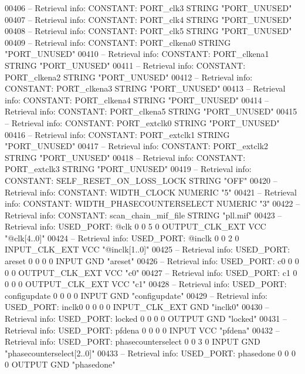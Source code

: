 \begin{DoxyCode}
{00406 \textcolor{keyword}{-- Retrieval info: CONSTANT: PORT\_clk3 STRING "PORT\_UNUSED"}
00407 \textcolor{keyword}{-- Retrieval info: CONSTANT: PORT\_clk4 STRING "PORT\_UNUSED"}
00408 \textcolor{keyword}{-- Retrieval info: CONSTANT: PORT\_clk5 STRING "PORT\_UNUSED"}
00409 \textcolor{keyword}{-- Retrieval info: CONSTANT: PORT\_clkena0 STRING "PORT\_UNUSED"}
00410 \textcolor{keyword}{-- Retrieval info: CONSTANT: PORT\_clkena1 STRING "PORT\_UNUSED"}
00411 \textcolor{keyword}{-- Retrieval info: CONSTANT: PORT\_clkena2 STRING "PORT\_UNUSED"}
00412 \textcolor{keyword}{-- Retrieval info: CONSTANT: PORT\_clkena3 STRING "PORT\_UNUSED"}
00413 \textcolor{keyword}{-- Retrieval info: CONSTANT: PORT\_clkena4 STRING "PORT\_UNUSED"}
00414 \textcolor{keyword}{-- Retrieval info: CONSTANT: PORT\_clkena5 STRING "PORT\_UNUSED"}
00415 \textcolor{keyword}{-- Retrieval info: CONSTANT: PORT\_extclk0 STRING "PORT\_UNUSED"}
00416 \textcolor{keyword}{-- Retrieval info: CONSTANT: PORT\_extclk1 STRING "PORT\_UNUSED"}
00417 \textcolor{keyword}{-- Retrieval info: CONSTANT: PORT\_extclk2 STRING "PORT\_UNUSED"}
00418 \textcolor{keyword}{-- Retrieval info: CONSTANT: PORT\_extclk3 STRING "PORT\_UNUSED"}
00419 \textcolor{keyword}{-- Retrieval info: CONSTANT: SELF\_RESET\_ON\_LOSS\_LOCK STRING "OFF"}
00420 \textcolor{keyword}{-- Retrieval info: CONSTANT: WIDTH\_CLOCK NUMERIC "5"}
00421 \textcolor{keyword}{-- Retrieval info: CONSTANT: WIDTH\_PHASECOUNTERSELECT NUMERIC "3"}
00422 \textcolor{keyword}{-- Retrieval info: CONSTANT: scan\_chain\_mif\_file STRING "pll.mif"}
00423 \textcolor{keyword}{-- Retrieval info: USED\_PORT: @clk 0 0 5 0 OUTPUT\_CLK\_EXT VCC "@clk[4..0]"}
00424 \textcolor{keyword}{-- Retrieval info: USED\_PORT: @inclk 0 0 2 0 INPUT\_CLK\_EXT VCC "@inclk[1..0]"}
00425 \textcolor{keyword}{-- Retrieval info: USED\_PORT: areset 0 0 0 0 INPUT GND "areset"}
00426 \textcolor{keyword}{-- Retrieval info: USED\_PORT: c0 0 0 0 0 OUTPUT\_CLK\_EXT VCC "c0"}
00427 \textcolor{keyword}{-- Retrieval info: USED\_PORT: c1 0 0 0 0 OUTPUT\_CLK\_EXT VCC "c1"}
00428 \textcolor{keyword}{-- Retrieval info: USED\_PORT: configupdate 0 0 0 0 INPUT GND "configupdate"}
00429 \textcolor{keyword}{-- Retrieval info: USED\_PORT: inclk0 0 0 0 0 INPUT\_CLK\_EXT GND "inclk0"}
00430 \textcolor{keyword}{-- Retrieval info: USED\_PORT: locked 0 0 0 0 OUTPUT GND "locked"}
00431 \textcolor{keyword}{-- Retrieval info: USED\_PORT: pfdena 0 0 0 0 INPUT VCC "pfdena"}
00432 \textcolor{keyword}{-- Retrieval info: USED\_PORT: phasecounterselect 0 0 3 0 INPUT GND "phasecounterselect[2..0]"}
00433 \textcolor{keyword}{-- Retrieval info: USED\_PORT: phasedone 0 0 0 0 OUTPUT GND "phasedone"}
}
\end{DoxyCode}

